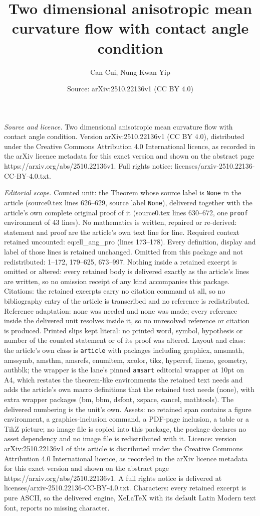 \documentclass[10pt,a4paper]{amsart}
\title[Two dimensional anisotropic mean curvature flow with contact]{Two dimensional anisotropic mean curvature flow with contact angle condition}
\author{Can Cui, Nung Kwan Yip}
\date{Source: arXiv:2510.22136v1 (CC BY 4.0)}
\begin{document}
\maketitle

\noindent\emph{Source and licence.} Two dimensional anisotropic mean curvature flow with contact angle condition. Version arXiv:2510.22136v1 (CC BY 4.0), distributed under the Creative Commons Attribution 4.0 International licence, as recorded in the arXiv licence metadata for this exact version and shown on the abstract page https://arxiv.org/abs/2510.22136v1. Full rights notice: licenses/arxiv-2510.22136-CC-BY-4.0.txt.\par\smallskip

\noindent\textit{Editorial scope.} Counted unit: the Theorem whose source label is \texttt{None} in the article (source0.tex lines 626--629, source label \texttt{None}), delivered together with the article's own complete original proof of it (source0.tex lines 630--672, one \texttt{proof} environment of 43 lines). No mathematics is written, repaired or re-derived: statement and proof are the article's own text line for line. Required context retained uncounted: eq:ell\_ang\_pro (lines 173--178). Every definition, display and label of those lines is retained unchanged. Omitted from this package and not redistributed: 1--172, 179--625, 673--997. Nothing inside a retained excerpt is omitted or altered: every retained body is delivered exactly as the article's lines are written, so no omission receipt of any kind accompanies this package. Citations: the retained excerpts carry no citation command at all, so no bibliography entry of the article is transcribed and no reference is redistributed. Reference adaptation: none was needed and none was made; every reference inside the delivered unit resolves inside it, so no unresolved reference or citation is produced. Printed slips kept literal: no printed word, symbol, hypothesis or number of the counted statement or of its proof was altered. Layout and class: the article's own class is \texttt{article} with packages including graphicx, amsmath, amssymb, amsthm, amsrefs, enumitem, xcolor, tikz, hyperref, lineno, geometry, authblk; the wrapper is the lane's pinned \texttt{amsart} editorial wrapper at 10pt on A4, which restates the theorem-like environments the retained text needs and adds the article's own macro definitions that the retained text needs (none), with extra wrapper packages (bm, bbm, dsfont, xspace, cancel, mathtools). The delivered numbering is the unit's own. Assets: no retained span contains a figure environment, a graphics-inclusion command, a PDF-page inclusion, a table or a TikZ picture; no image file is copied into this package, the package declares no asset dependency and no image file is redistributed with it. Licence: version arXiv:2510.22136v1 of this article is distributed under the Creative Commons Attribution 4.0 International licence, as recorded in the arXiv licence metadata for this exact version and shown on the abstract page https://arxiv.org/abs/2510.22136v1. A full rights notice is delivered at licenses/arxiv-2510.22136-CC-BY-4.0.txt. Characters: every retained excerpt is pure ASCII, so the delivered engine, XeLaTeX with its default Latin Modern text font, reports no missing character.
\end{document}
